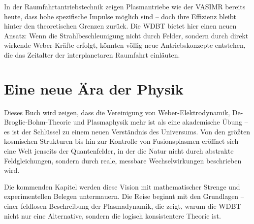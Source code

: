 In der Raumfahrtantriebstechnik zeigen Plasmantriebe wie der VASIMR bereits heute, dass hohe spezifische Impulse möglich sind – doch ihre Effizienz bleibt hinter den theoretischen
Grenzen zurück. Die WDBT bietet hier einen neuen Ansatz: Wenn die Strahlbeschleunigung nicht durch Felder, sondern durch direkt wirkende Weber-Kräfte erfolgt, könnten völlig neue
Antriebskonzepte entstehen, die das Zeitalter der interplanetaren Raumfahrt einläuten.

\section{Eine neue Ära der Physik}
Dieses Buch wird zeigen, dass die Vereinigung von Weber-Elektrodynamik, De-Broglie-Bohm-Theorie und Plasmaphysik mehr ist als eine akademische Übung – es ist der Schlüssel zu
einem neuen Verständnis des Universums. Von den größten kosmischen Strukturen bis hin zur Kontrolle von Fusionsplasmen eröffnet sich eine Welt jenseits der Quantenfelder, in der
die Natur nicht durch abstrakte Feldgleichungen, sondern durch reale, messbare Wechselwirkungen beschrieben wird.

Die kommenden Kapitel werden diese Vision mit mathematischer Strenge und experimentellen Belegen untermauern. Die Reise beginnt mit den Grundlagen – einer feldlosen Beschreibung
der Plasmadynamik, die zeigt, warum die WDBT nicht nur eine Alternative, sondern die logisch konsistentere Theorie ist.
